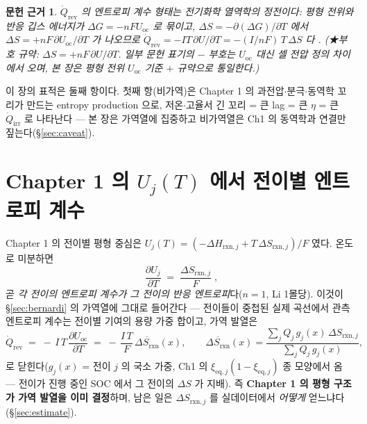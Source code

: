 \documentclass[11pt,a4paper]{article}
\newtheorem*{srcbox}{문헌 근거}
\newcommand{\rxn}{\mathrm{rxn}}
\newcommand{\eq}{\mathrm{eq}}
\newcommand{\rev}{\mathrm{rev}}
\newcommand{\irr}{\mathrm{irr}}
\newcommand{\oc}{\mathrm{oc}}
\begin{document}
\begin{srcbox}
$\dot Q_\rev$ 의 엔트로피 계수 형태는 전기화학 열역학의 정전이다: 평형 전위와 반응 깁스 에너지가
$\Delta G=-nFU_\oc$ 로 묶이고, $\Delta S=-\partial(\Delta G)/\partial T$ 에서
$\Delta S=+nF\,\partial U_\oc/\partial T$ 가 나오므로 $\dot Q_\rev=-IT\,\partial U/\partial T
= -(I/nF)\,T\,\Delta S$ 다 \cite{newman,msmr_partI}. (★부호 규약: $\Delta S=+nF\,\partial U/\partial T$.
일부 문헌 표기의 $-$ 부호는 $U_\oc$ 대신 셀 전압 정의 차이에서 오며, 본 장은 평형 전위 $U_\oc$ 기준 $+$
규약으로 통일한다.)
\end{srcbox}

이 장의 표적은 둘째 항이다. 첫째 항(비가역)은 Chapter 1 의 과전압$\cdot$분극$\cdot$동역학 꼬리가 만드는
entropy production 으로, 저온$\cdot$고율서 긴 꼬리 = 큰 lag = 큰 $\eta$ = 큰 $\dot Q_\irr$ 로 나타난다
— 본 장은 가역열에 집중하고 비가역열은 Ch1 의 동역학과 연결만 짚는다(\S\ref{sec:caveat}).

\section{Chapter 1 의 $U_j(T)$ 에서 전이별 엔트로피 계수}\label{sec:coeff}
Chapter 1 의 전이별 평형 중심은 $U_j(T)=(-\Delta H_{\rxn,j}+T\,\Delta S_{\rxn,j})/F$ 였다. 온도로 미분하면
\begin{equation}
\boxed{\;\frac{\partial U_j}{\partial T}\;=\;\frac{\Delta S_{\rxn,j}}{F}\;,}
\label{eq:coeff}
\end{equation}
곧 \emph{각 전이의 엔트로피 계수가 그 전이의 반응 엔트로피}다($n=1$, Li 1몰당). 이것이 \S\ref{sec:bernardi}
의 가역열에 그대로 들어간다 — 전이들이 중첩된 실제 곡선에서 관측 엔트로피 계수는 전이별 기여의
용량 가중 합이고, 가역 발열은
\begin{equation}
\dot Q_\rev \;=\; -\,I\,T\,\frac{\partial U_\oc}{\partial T}
\;=\; -\,\frac{I\,T}{F}\,\overline{\Delta S_{\rxn}}(x),
\qquad
\overline{\Delta S_\rxn}(x)=\frac{\sum_j Q_j\,g_j(x)\,\Delta S_{\rxn,j}}{\sum_j Q_j\,g_j(x)},
\label{eq:qrev_sum}
\end{equation}
로 닫힌다($g_j(x)$ = 전이 $j$ 의 국소 가중, Ch1 의 $\xi_{\eq,j}(1-\xi_{\eq,j})$ 종 모양에서 옴 —
전이가 진행 중인 SOC 에서 그 전이의 $\Delta S$ 가 지배). 즉 \textbf{Chapter 1 의 평형 구조가 가역 발열을
이미 결정}하며, 남은 일은 $\Delta S_{\rxn,j}$ 를 실데이터에서 \emph{어떻게} 얻느냐다(\S\ref{sec:estimate}).
\end{document}
